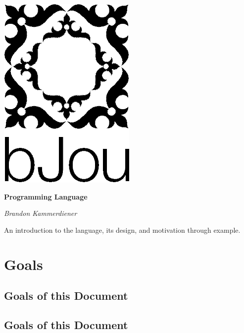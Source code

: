 \documentclass{article}
\begin{document}
\begin{titlepage}
	\centering

	\includegraphics[scale=0.5]{black.PNG}

	\vspace{1cm}

	{\huge\bfseries Programming Language}

	\vspace{5cm}

	{\itshape\Large Brandon Kammerdiener}

	\vfill

	{\large An introduction to the language, its design, and motivation through example. }

\end{titlepage}

\newpage

\tableofcontents

\newpage

\section*{Goals}

	\subsection*{Goals of this Document}
	
	\subsection*{Goals of this Document}
	
\end{document}
